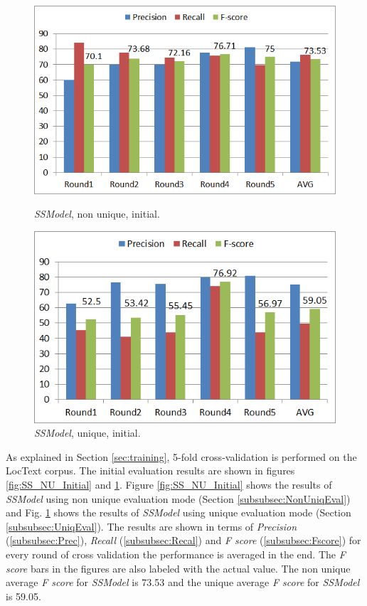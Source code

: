 \begin{figure}
\centering
\begin{minipage}{.5\textwidth}
  \centering
  \includegraphics[width=.95\textwidth]{figures/SSInitialResultsNUniq.png}
  \caption{\textit{SSModel}, non unique, initial.}
  \label{fig:SS_NU_Initial}
\end{minipage}%
\begin{minipage}{.5\textwidth}
  \centering
  \includegraphics[width=.95\textwidth]{figures/SSInitialResultsUniq.png}
  \caption{\textit{SSModel}, unique, initial.}
  \label{fig:SS_U_Initial}
\end{minipage}
\end{figure}

As explained in Section \ref{sec:training}, 5-fold cross-validation is performed on the LocText corpus. The initial evaluation results are shown in figures \ref{fig:SS_NU_Initial} and \ref{fig:SS_U_Initial}. Figure \ref{fig:SS_NU_Initial} shows the results of \textit{SSModel} using non unique evaluation mode (Section \ref{subsubsec:NonUniqEval}) and Fig. \ref{fig:SS_U_Initial} shows the results of \textit{SSModel} using unique evaluation mode (Section \ref{subsubsec:UniqEval}). The results are shown in terms of \textit{Precision} (\ref{subsubsec:Prec}), \textit{Recall} (\ref{subsubsec:Recal}) and \textit{F score} (\ref{subsubsec:Fscore}) for every round of cross validation the performance is averaged in the end. The \textit{F score} bars in the figures are also labeled with the actual value. The non unique average \textit{F score} for \textit{SSModel} is 73.53 and the unique average \textit{F score} for \textit{SSModel} is 59.05.

